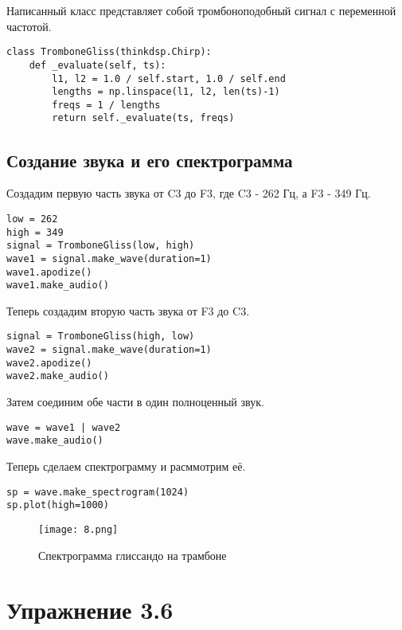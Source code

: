 \documentclass[a4paper,12pt]{report}
\begin{document}
Написанный класс представляет собой тромбоноподобный сигнал с переменной частотой.

\begin{lstlisting}[caption=Создание класса]
class TromboneGliss(thinkdsp.Chirp):
    def _evaluate(self, ts):
        l1, l2 = 1.0 / self.start, 1.0 / self.end
        lengths = np.linspace(l1, l2, len(ts)-1)
        freqs = 1 / lengths
        return self._evaluate(ts, freqs)
\end{lstlisting}

\section{Создание звука и его спектрограмма}

Создадим первую часть звука от C3 до F3, где C3 - 262 Гц, а F3 - 349 Гц.

\begin{lstlisting}[caption=Создание первой части звука]
low = 262
high = 349
signal = TromboneGliss(low, high)
wave1 = signal.make_wave(duration=1)
wave1.apodize()
wave1.make_audio()
\end{lstlisting}

Теперь создадим вторую часть звука от F3 до C3.

\begin{lstlisting}[caption=Создание второй части звука]
signal = TromboneGliss(high, low)
wave2 = signal.make_wave(duration=1)
wave2.apodize()
wave2.make_audio()
\end{lstlisting}

Затем соединим обе части в один полноценный звук.

\begin{lstlisting}[caption=Соединение двух частей звука]
wave = wave1 | wave2
wave.make_audio()
\end{lstlisting}

Теперь сделаем спектрограмму и расммотрим её.

\begin{lstlisting}[caption=Спектрограмма звука]
sp = wave.make_spectrogram(1024)
sp.plot(high=1000)
\end{lstlisting}

\begin{figure}[H]
        \centering
        \texttt{[image: 8.png]}
        \caption{Спектрограмма глиссандо на трамбоне}
        \label{fig:lab3_fig8}
\end{figure}


\chapter{Упражнение 3.6}
\end{document}
